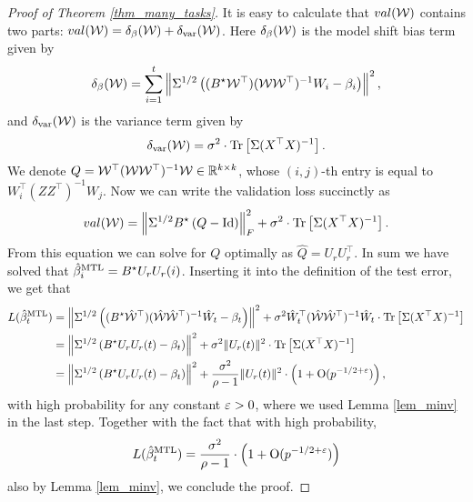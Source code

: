 \begin{proof}[Proof of Theorem \ref{thm_many_tasks}]
	It is easy to calculate that $\val( \cal W)$ contains two parts: $\val( \cal W)= \delta_{\beta}(\cal W) + \delta_{\vari}(\cal W)$. Here $\delta_{\beta}(\cal W) $ is the model shift bias term given by
	\begin{align*}
		\delta_{\beta}(\cal W) =\sum_{i=1}^t  \bignorm{\Sigma^{1/2}\bigbrace{(B^\star \cal W^\top) (\cal W\cal W^{\top})^{-1} W_i - \beta_i}}^2,
	\end{align*}
	and $\delta_{\vari}(\cal W)$ is the variance term given by
	\begin{align*}
		\delta_{\vari}(\cal W)= \sigma^2 \cdot \bigtr{\Sigma (X^{\top}X)^{-1}}.
	\end{align*}
	We denote $Q = \cal W^{\top} (\cal W\cal W^{\top})^{-1} \cal W \in\real^{k\times k}$, whose $(i,j)$-th entry is equal to $W_i^{\top} (ZZ^{\top})^{-1} W_j$.
	Now we can write the validation loss succinctly as 
	\begin{align*}
		\val(\cal W) = \bignormFro{\Sigma^{1/2}B^{\star}  \bigbrace{Q -\id}}^2 + \sigma^2 \cdot \bigtr{\Sigma (X^{\top}X)^{-1}}.
	\end{align*}
	From this equation we can solve for $Q$ optimally as $\hat Q=U_{r}U_r^{\top}$.
	In sum we have solved that $\hat{\beta}_i^{\MTL}=B^{\star} U_r U_r(i)$. Inserting it into the definition of the test error, we get that
	\begin{align*}
		\te(\hat{\beta}_t^{\MTL}) &= \bignorm{\Sigma^{1/2} \left((B^\star \hat{\cal W}^\top) (\hat{\cal W}\hat{\cal W}^{\top})^{-1} \hat W_t - \beta_t \right) }^2
		+ \sigma^2  \hat W_t^{\top} (\hat{\cal W}\hat{\cal W}^{\top})^{-1} \hat W_t \cdot \bigtr{\Sigma (X^{\top}X)^{-1}} \\
		&= \bignorm{\Sigma^{1/2} \bigbrace{B^{\star} U_r U_r(t)-\beta_t}}^2 + \sigma^2\norm{U_r(t)}^2 \cdot \bigtr{\Sigma (X^{\top}X)^{-1}} \\
		&= \bignorm{\Sigma^{1/2} \bigbrace{B^{\star} U_r U_r(t)-\beta_t}}^2 + \frac{\sigma^2}{\rho-1}\norm{U_r(t)}^2 \cdot \left( 1+\OO(p^{-1/2+\e})\right),
	\end{align*}
	with high probability for any constant $\e>0$, where we used Lemma \ref{lem_minv} in the last step. Together with the fact that with high probability,
	$$\te(\hat{\beta}_t^{\MTL})=\frac{\sigma^2}{\rho-1} \cdot \left( 1+\OO(p^{-1/2+\e})\right)$$
	 also by Lemma \ref{lem_minv}, we conclude the proof.
\end{proof}
